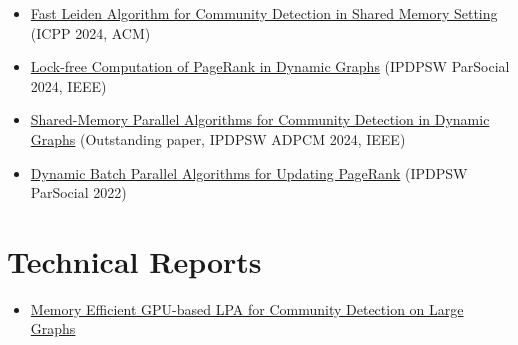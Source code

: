 \begin{itemize}[noitemsep, leftmargin=*]
  \item \href{https://dl.acm.org/doi/abs/10.1145/3673038.3673146}{Fast Leiden Algorithm for Community Detection in Shared Memory Setting} (ICPP 2024, ACM)
  \item \href{https://ieeexplore.ieee.org/abstract/document/10596502/}{Lock-free Computation of PageRank in Dynamic Graphs} (IPDPSW ParSocial 2024, IEEE)
  \item \href{https://ieeexplore.ieee.org/abstract/document/10596428/}{Shared-Memory Parallel Algorithms for Community Detection in Dynamic Graphs} (Outstanding paper, IPDPSW ADPCM 2024, IEEE)
  \item \href{https://ieeexplore.ieee.org/abstract/document/9835216/}{Dynamic Batch Parallel Algorithms for Updating PageRank} (IPDPSW ParSocial 2022)
\end{itemize}




\section*{Technical Reports}

\begin{itemize}[noitemsep, leftmargin=*]
  \item \href{https://arxiv.org/abs/2411.19901}{Memory Efficient GPU-based LPA for Community Detection on Large Graphs}
\end{itemize}
